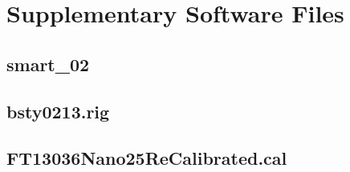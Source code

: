 \section{Supplementary Software Files}
\subsection{smart\_02}

\pagebreak
\subsection{bsty0213.rig}

\pagebreak
\subsection{FT13036Nano25ReCalibrated.cal}
\lstset{language=XML}

\lstset{language=Python}